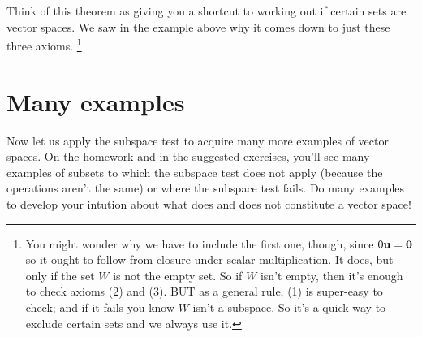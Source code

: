 Think of this theorem as giving you a shortcut to working out
if certain sets are vector spaces.  We saw in the example above
why it comes down to just these three axioms. \footnote{You might wonder why we have to include the first one, though,
since $0 \mathbf{u} = \mathbf{0}$ so it ought to follow from closure
under scalar multiplication.  It does, but only if the set
$W$ is not the empty set.  So if $W$ isn't empty, then it's 
enough to check axioms (2) and (3).  BUT as a general rule, 
(1) is super-easy to check;  and if it fails you know $W$ isn't
a subspace.  So it's a quick way to exclude certain sets and
we always use it.}

\section{Many examples}  Now let us apply the subspace
test to acquire many more examples of vector spaces.  On
the homework and in the suggested exercises, you'll see
many examples of subsets to which the subspace test does
not apply (because the operations aren't the same) or where
the subspace test fails.  Do many examples to develop your
intution about what does and does not constitute a vector
space!

